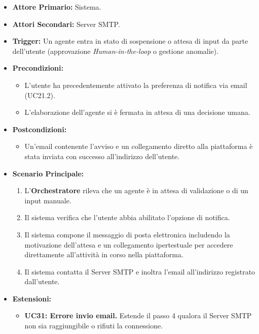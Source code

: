 \documentclass[12pt, a4paper]{article}
\begin{document}
\begin{itemize}
    \item \textbf{Attore Primario:} Sistema.
    \item \textbf{Attori Secondari:} Server SMTP.
    \item \textbf{Trigger:} Un agente entra in stato di sospensione o attesa di input da parte dell'utente (approvazione \textit{Human-in-the-loop} o gestione anomalie).
    \item \textbf{Precondizioni:}
    \begin{itemize}
        \item L'utente ha precedentemente attivato la preferenza di notifica via email (UC21.2).
        \item L'elaborazione dell'agente si è fermata in attesa di una decisione umana.
    \end{itemize}
    \item \textbf{Postcondizioni:}
    \begin{itemize}
        \item Un'email contenente l'avviso e un collegamento diretto alla piattaforma è stata inviata con successo all'indirizzo dell'utente.
    \end{itemize}
    \item \textbf{Scenario Principale:}
    \begin{enumerate}
        \item L'\textbf{Orchestratore} rileva che un agente è in attesa di validazione o di un input manuale.
        \item Il sistema verifica che l'utente abbia abilitato l'opzione di notifica.
        \item Il sistema compone il messaggio di posta elettronica includendo la motivazione dell'attesa e un collegamento ipertestuale per accedere direttamente all'attività in corso nella piattaforma.
        \item Il sistema contatta il Server SMTP e inoltra l'email all'indirizzo registrato dall'utente.
    \end{enumerate}
    \item \textbf{Estensioni:}
    \begin{itemize}
        \item \textbf{UC31: Errore invio email.} Estende il passo 4 qualora il Server SMTP non sia raggiungibile o rifiuti la connessione.
    \end{itemize}
\end{itemize}
\end{document}
